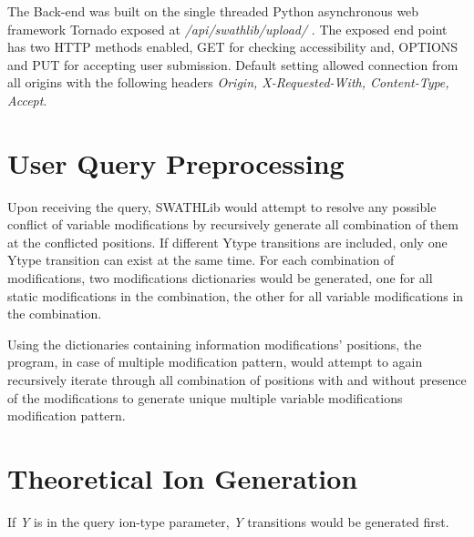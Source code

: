 \documentclass[../manual.tex]{subfiles}
\begin{document}
The Back-end was built on the single threaded Python asynchronous web framework Tornado exposed at \emph{/api/swathlib/upload/} . The exposed end point has two HTTP methods enabled, GET for checking accessibility and, OPTIONS and PUT for accepting user submission. Default setting allowed connection from all origins with the following headers \emph{Origin, X-Requested-With, Content-Type, Accept}.

\section{User Query Preprocessing}
Upon receiving the query, SWATHLib would attempt to resolve any possible conflict of variable modifications by recursively generate all combination of them at the conflicted positions. If different Ytype transitions are included, only one Ytype transition can exist at the same time. For each combination of modifications, two modifications dictionaries would be generated, one for all static modifications in the combination, the other for all variable modifications in the combination.\par

Using the dictionaries containing information modifications' positions, the program, in case of multiple modification pattern, would attempt to again recursively iterate through all combination of positions with and without presence of the modifications to generate unique multiple variable modifications modification pattern.  

\section{Theoretical Ion Generation}
If \emph{Y} is in the query ion-type parameter, \emph{Y} transitions would be generated first.
\end{document}
